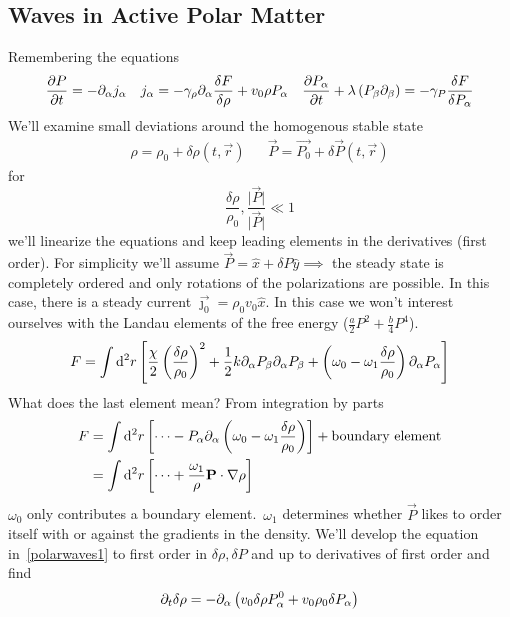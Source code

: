 \subsection{Waves in Active Polar Matter}
Remembering the equations
\begin{align}\label{polarwaves1}
    \diffp{P}{t} = -\partial_\alpha j_\alpha && j_\alpha = -\gamma_\rho\partial_\alpha\frac{\delta F}{\delta\rho}+v_0\rho P_\alpha && \diffp{P_\alpha}{t} + \lambda\ins{P_\beta\partial_\beta} = -\gamma_P \frac{\delta F}{\delta P_\alpha}
\end{align}
We'll examine small deviations around the homogenous stable state
\begin{align}
    \rho = \rho_0 + \delta\rho(t,\vec{r}) && \vec{P} = \vec{P_0} + \delta\vec{P}(t,\vec{r})
\end{align}
for
\begin{equation}
    \frac{\delta \rho}{\rho_0},\frac{\lvert\vec{P}\rvert}{\lvert\vec{P}\rvert} \ll 1
\end{equation}
we'll linearize the equations and keep leading elements in the derivatives (first order). For simplicity we'll assume \(\vec{P} = \hat{x} + \delta P\hat{y}\implies \) the steady state is completely ordered and only rotations of the polarizations are possible. In this case, there is a steady current \(\vec{\jmath_0}=\rho_0v_0\hat{x}\). In this case we won't interest ourselves with the Landau elements of the free energy (\(\frac{a}{2}P^2+\frac{b}{4}P^4\)).
\begin{align}
    F = \int\mathop{}\!\mathrm{d}^2 r \left[\frac{\chi}{2}\left(\frac{\delta\rho}{\rho_0}\right)^2+\frac{1}{2}k\partial_\alpha P_\beta\partial_\alpha P_\beta + \left(\omega_0-\omega_1\frac{\delta\rho}{\rho_0}\right)\partial_\alpha P_\alpha\right]
\end{align}
What does the last element mean? From integration by parts
\begin{align}
    F &= \int\mathop{}\!\mathrm{d}^2 r \left[\dots - P_\alpha\partial_\alpha\left(\omega_0-\omega_1\frac{\delta\rho}{\rho_0}\right)\right] + \text{boundary element}\\
    &= \int\mathop{}\!\mathrm{d}^2 r \left[\dots + \frac{\omega_1}{\rho}\mathbf{P}\cdot\nabla\rho\right]
\end{align}
\(\omega_0\) only contributes a boundary element.\  \(\omega_1\) determines whether \(\vec{P}\) likes to order itself with or against the gradients in the density.
We'll develop the equation in~\ref{polarwaves1} to first order in \(\delta\rho, \delta P\) and up to derivatives of first order and find
\begin{align}
    \partial_t\delta\rho = -\partial_\alpha\left(v_0\delta\rho P_\alpha^0 + v_0\rho_0\delta P_\alpha\right)
\end{align}
